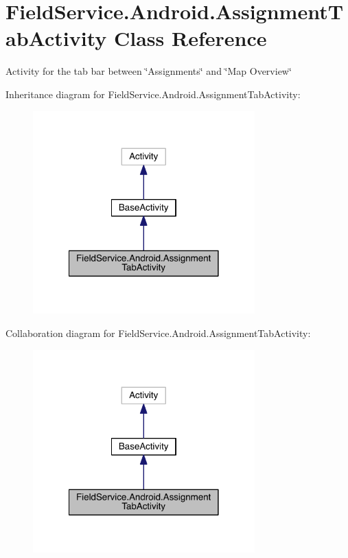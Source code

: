 \hypertarget{class_field_service_1_1_android_1_1_assignment_tab_activity}{\section{Field\+Service.\+Android.\+Assignment\+Tab\+Activity Class Reference}
\label{class_field_service_1_1_android_1_1_assignment_tab_activity}
}


Activity for the tab bar between \char`\"{}\+Assignments\char`\"{} and \char`\"{}\+Map Overview\char`\"{}  




Inheritance diagram for Field\+Service.\+Android.\+Assignment\+Tab\+Activity\+:
\nopagebreak
\begin{figure}[H]
\begin{center}
\leavevmode
\includegraphics[width=242pt]{class_field_service_1_1_android_1_1_assignment_tab_activity__inherit__graph}
\end{center}
\end{figure}


Collaboration diagram for Field\+Service.\+Android.\+Assignment\+Tab\+Activity\+:
\nopagebreak
\begin{figure}[H]
\begin{center}
\leavevmode
\includegraphics[width=242pt]{class_field_service_1_1_android_1_1_assignment_tab_activity__coll__graph}
\end{center}
\end{figure}
